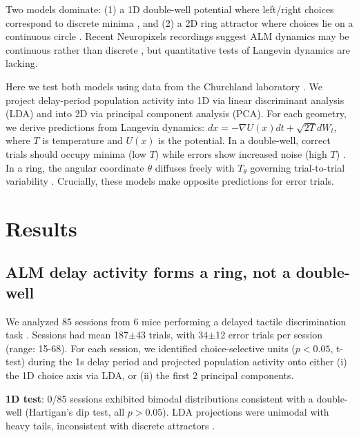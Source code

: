 \documentclass[11pt,a4paper]{article}
\begin{document}
Two models dominate: (1) a 1D double-well potential where left/right choices correspond to discrete minima \citep{wang2002probabilistic,brunel2001effects}, and (2) a 2D ring attractor where choices lie on a continuous circle \citep{zhang1996representation,compte2000synaptic,wimmer2014ring}. Recent Neuropixels recordings suggest ALM dynamics may be continuous rather than discrete \citep{inzunza2023high}, but quantitative tests of Langevin dynamics are lacking.

Here we test both models using data from the Churchland laboratory \citep{churchland2019single}. We project delay-period population activity into 1D via linear discriminant analysis (LDA) and into 2D via principal component analysis (PCA). For each geometry, we derive predictions from Langevin dynamics: \texorpdfstring{$dx = -\nabla U(x)dt + \sqrt{2T}dW_t$}{dx = -nabla U(x)dt + sqrt(2T)dW_t}, where \texorpdfstring{$T$}{T} is temperature and \texorpdfstring{$U(x)$}{U(x)} is the potential. In a double-well, correct trials should occupy minima (low \texorpdfstring{$T$}{T}) while errors show increased noise (high \texorpdfstring{$T$}{T}) \citep{wang2002probabilistic}. In a ring, the angular coordinate \texorpdfstring{$\theta$}{theta} diffuses freely with \texorpdfstring{$T_\theta$}{T_theta} governing trial-to-trial variability \citep{benyishay2018directional}. Crucially, these models make opposite predictions for error trials.

\section{Results}

\subsection{ALM delay activity forms a ring, not a double-well}

We analyzed 85 sessions from 6 mice performing a delayed tactile discrimination task \citep{churchland2019single}. Sessions had mean 187$\pm$43 trials, with 34$\pm$12 error trials per session (range: 15-68). For each session, we identified choice-selective units (\texorpdfstring{$p<0.05$}{p<0.05}, t-test) during the 1s delay period and projected population activity onto either (i) the 1D choice axis via LDA, or (ii) the first 2 principal components.

\textbf{1D test}: 0/85 sessions exhibited bimodal distributions consistent with a double-well (Hartigan's dip test, all \texorpdfstring{$p>0.05$}{p>0.05}). LDA projections were unimodal with heavy tails, inconsistent with discrete attractors \citep{brody2003timing,latimer2015single}.
\end{document}
